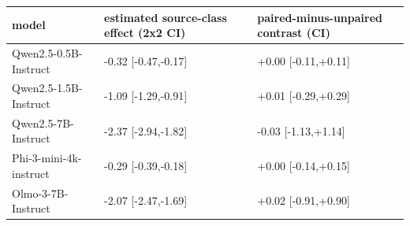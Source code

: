\begin{tabular}{lll}
\toprule
model & estimated source-class effect (2x2 CI) & paired-minus-unpaired contrast (CI) \\
\midrule
Qwen2.5-0.5B-Instruct & -0.32 [-0.47,-0.17] & +0.00 [-0.11,+0.11] \\
Qwen2.5-1.5B-Instruct & -1.09 [-1.29,-0.91] & +0.01 [-0.29,+0.29] \\
Qwen2.5-7B-Instruct & -2.37 [-2.94,-1.82] & -0.03 [-1.13,+1.14] \\
Phi-3-mini-4k-instruct & -0.29 [-0.39,-0.18] & +0.00 [-0.14,+0.15] \\
Olmo-3-7B-Instruct & -2.07 [-2.47,-1.69] & +0.02 [-0.91,+0.90] \\
\bottomrule
\end{tabular}
